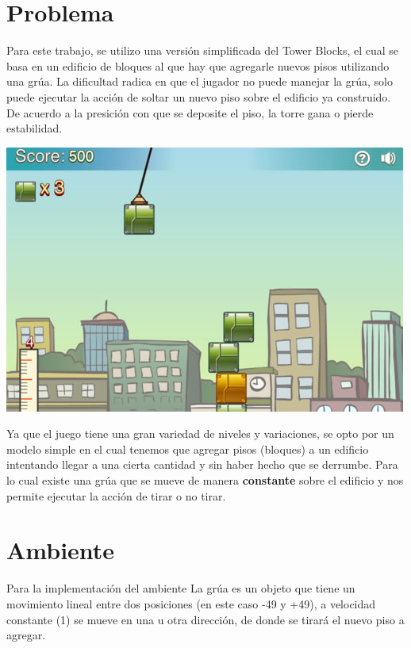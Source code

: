 \documentclass[11pt, a4paper]{article}
\begin{document}
	\maketitle

\section{Problema}
Para este trabajo, se utilizo una versi\'on simplificada del Tower Blocks, el cual se basa en un edificio de bloques al que hay que agregarle nuevos pisos utilizando una gr\'ua. La dificultad radica en que el jugador no puede manejar la gr\'ua, solo puede ejecutar la acci\'on de soltar un nuevo piso sobre el edificio ya construido. De acuerdo a la presici\'on con que se deposite el piso, la torre gana o pierde estabilidad. 
\begin{center} \includegraphics[scale=0.50]{towerblocks}\end{center}

Ya que el juego tiene una gran variedad de niveles y variaciones, se opto por un modelo simple en el cual tenemos que agregar pisos (bloques) a un edificio intentando llegar a una cierta cantidad y sin haber hecho que se derrumbe. Para lo cual existe una gr\'ua que se mueve de manera \textbf{constante} sobre el edificio y nos permite ejecutar la acci\'on de tirar o no tirar. 

\section{Ambiente}
Para la implementaci\'on del ambiente
La grúa es un objeto que tiene un movimiento lineal entre dos posiciones (en este caso -49 y +49), a velocidad constante (1) se mueve en una u otra dirección, de donde se tirará el nuevo piso a agregar. 
\end{document}
